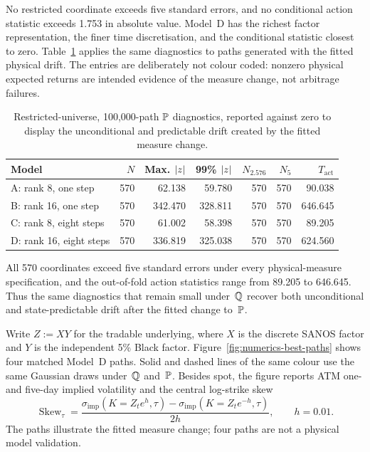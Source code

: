 {No restricted coordinate exceeds five standard errors, and no conditional
action statistic exceeds 1.753 in absolute value.  Model~D has the richest
factor representation, the finer time discretisation, and the conditional
statistic closest to zero.  Table~\ref{tab:numerics-restricted-p} applies the
same diagnostics to paths generated with the fitted physical drift.  The
entries are deliberately not colour coded: nonzero physical expected returns
are intended evidence of the measure change, not arbitrage failures.

\begin{table}[H]
\centering
\small
\begin{tabular}{lrrrrrr}
\toprule
Model & $N$ & Max. $\lvert z\rvert$ & 99\% $\lvert z\rvert$
  & $N_{2.576}$ & $N_5$ & $T_{\mathrm{act}}$\\
\midrule
A: rank 8, one step    & 570 & 62.138 & 59.780 & 570 & 570 & 90.038\\
B: rank 16, one step   & 570 & 342.470 & 328.811 & 570 & 570 & 646.645\\
C: rank 8, eight steps & 570 & 61.002 & 58.398 & 570 & 570 & 89.205\\
D: rank 16, eight steps& 570 & 336.819 & 325.038 & 570 & 570 & 624.560\\
\bottomrule
\end{tabular}
\caption{Restricted-universe, 100,000-path $\mathbb P$ diagnostics, reported against
zero to display the unconditional and predictable drift created by the fitted
measure change.}
\label{tab:numerics-restricted-p}
\end{table}

All 570 coordinates exceed five standard errors under every physical-measure
specification, and the out-of-fold action statistics range from 89.205 to
646.645.  Thus the same diagnostics that remain small under~$\mathbb Q$ recover both
unconditional and state-predictable drift after the fitted change to~$\mathbb P$.

Write $Z:=XY$ for the tradable underlying, where $X$ is the discrete SANOS
factor and $Y$ is the independent 5\% Black factor.  Figure~\ref{fig:numerics-best-paths}
shows four matched Model~D paths.  Solid and dashed lines of the same colour use
the same Gaussian draws under~$\mathbb Q$ and~$\mathbb P$.  Besides spot, the figure reports
ATM one- and five-day implied volatility and the central log-strike skew
\begin{equation}\label{eq:numerics-atm-skew}
  \operatorname{Skew}_{\tau}
  =\frac{
    \sigma_{\mathrm{imp}}(K=Z_t e^h,\tau)
    -\sigma_{\mathrm{imp}}(K=Z_t e^{-h},\tau)
  }{2h},
  \qquad h=0.01.
\end{equation}
The paths illustrate the fitted measure change; four paths are not a physical
model validation.

}
